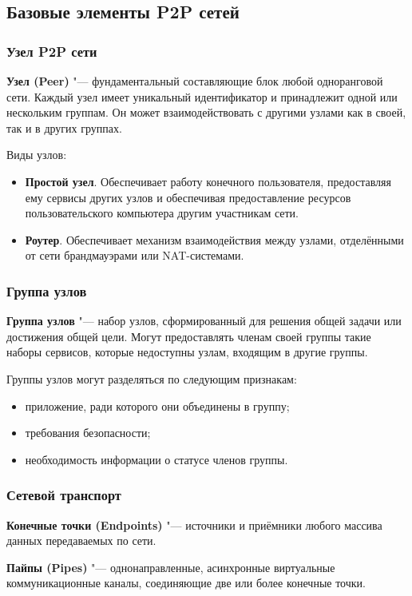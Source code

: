 \documentclass[bachelor, och, coursework]{SCWorks}
\begin{document}
\subsection{Базовые элементы P2P сетей}
\subsubsection{Узел P2P сети}
\textbf{Узел (Peer)} "--- фундаментальный составляющие блок любой одноранговой сети. Каждый узел имеет уникальный идентификатор и принадлежит одной или нескольким группам. Он может взаимодействовать с другими узлами как в своей, так и в других группах.

Виды узлов:
\begin{itemize}
    \item \textbf{Простой узел}. Обеспечивает работу конечного пользователя, предоставляя ему сервисы других узлов и	
    обеспечивая предоставление ресурсов пользовательского компьютера другим	участникам сети.
    \item \textbf{Роутер}. Обеспечивает механизм взаимодействия между узлами, отделёнными от сети брандмауэрами или NAT-системами.	
\end{itemize}

\subsubsection{Группа узлов}
\textbf{Группа узлов} "--- набор узлов, сформированный для решения общей задачи или достижения общей цели. Могут предоставлять членам своей группы такие наборы сервисов, которые недоступны узлам, входящим в другие группы.

Группы узлов могут разделяться по следующим признакам:
\begin{itemize}
    \item приложение, ради которого они объединены в группу;
    \item требования безопасности;
    \item необходимость информации о статусе членов группы.
\end{itemize}

\subsubsection{Сетевой транспорт}
\textbf{Конечные точки (Endpoints)} "--- источники и приёмники любого массива данных передаваемых по сети.

\textbf{Пайпы (Pipes)} "--- однонаправленные, асинхронные виртуальные коммуникационные каналы, соединяющие две или более конечные точки.
\end{document}
